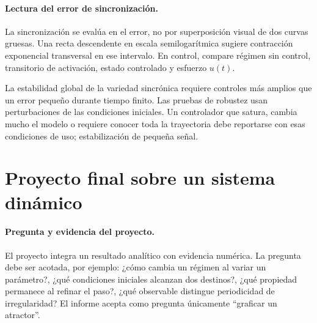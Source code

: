 \paragraph{Lectura del error de sincronización.}
La sincronización se evalúa en el error, no por superposición visual de dos curvas
gruesas. Una recta descendente en escala semilogarítmica sugiere contracción
exponencial transversal en ese intervalo. En control, compare régimen sin control,
transitorio de activación, estado controlado y esfuerzo \(u(t)\).

\begin{warningbox}
La estabilidad global de la variedad sincrónica requiere controles más amplios que un
error pequeño durante tiempo finito. Las pruebas de robustez usan perturbaciones de las condiciones iniciales. Un controlador que satura, cambia mucho el modelo o
requiere conocer toda la trayectoria debe reportarse con esas condiciones de uso;
estabilización de pequeña señal.
\end{warningbox}


\section{Proyecto final sobre un sistema dinámico}

\paragraph{Pregunta y evidencia del proyecto.}
El proyecto integra un resultado analítico con evidencia numérica. La pregunta debe
ser acotada, por ejemplo: ¿cómo cambia un régimen al variar un parámetro?, ¿qué
condiciones iniciales alcanzan dos destinos?, ¿qué propiedad permanece al refinar el
paso?, ¿qué observable distingue periodicidad de irregularidad? El informe acepta como
pregunta únicamente ``graficar un atractor''.

